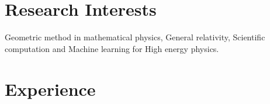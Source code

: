 \documentclass[letterpaper]{twentysecondcv} %
\begin{document}
\makeprofile %
 

\section{Research Interests}

Geometric method in mathematical physics, General relativity, Scientific computation and Machine learning for High energy physics.
 

\section{Experience}
\end{document}
